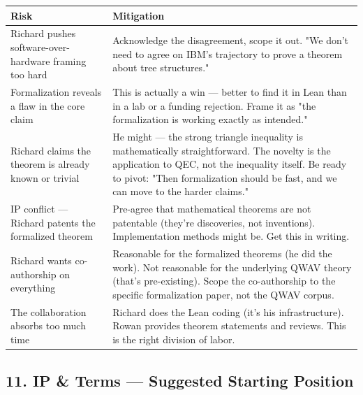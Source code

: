 \documentclass[11pt,a4paper]{article}
\begin{document}
\begin{tabular}{|l|l|}
\hline
\textbf{Risk} & \textbf{Mitigation} \\
\hline
Richard pushes software-over-hardware framing too hard & Acknowledge the disagreement, scope it out. "We don't need to agree on IBM's trajectory to prove a theorem about tree structures." \\
\hline
Formalization reveals a flaw in the core claim & This is actually a win  --- better to find it in Lean than in a lab or a funding rejection. Frame it as "the formalization is working exactly as intended." \\
\hline
Richard claims the theorem is already known or trivial & He might  --- the strong triangle inequality is mathematically straightforward. The novelty is the application to QEC, not the inequality itself. Be ready to pivot: "Then formalization should be fast, and we can move to the harder claims." \\
\hline
IP conflict  --- Richard patents the formalized theorem & Pre-agree that mathematical theorems are not patentable (they're discoveries, not inventions). Implementation methods might be. Get this in writing. \\
\hline
Richard wants co-authorship on everything & Reasonable for the formalized theorems (he did the work). Not reasonable for the underlying QWAV theory (that's pre-existing). Scope the co-authorship to the specific formalization paper, not the QWAV corpus. \\
\hline
The collaboration absorbs too much time & Richard does the Lean coding (it's his infrastructure). Rowan provides theorem statements and reviews. This is the right division of labor. \\
\hline
\end{tabular}


\hrulefill


\subsection{11. IP \& Terms  --- Suggested Starting Position}
\end{document}
